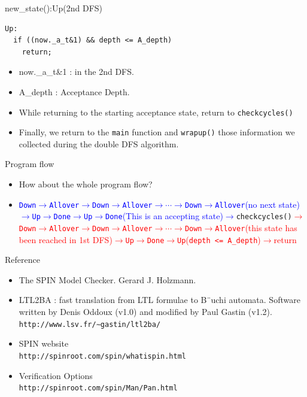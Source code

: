 \documentclass[12pt]{beamer}
\newcommand{\code}[1]{\texttt{#1}}
\begin{document}
\begin{frame}[fragile]{new\_state():Up(2nd DFS)}
\begin{lstlisting}[basicstyle=\footnotesize\ttfamily]
Up:
  if ((now._a_t&1) && depth <= A_depth)
    return;
\end{lstlisting}
\begin{itemize}
	\item now.\_a\_t\&1 : in the 2nd DFS.
	\item A\_depth : Acceptance Depth.
	\item While returning to the starting acceptance state, return to \code{checkcycles()}
	\item Finally, we return to the \code{main} function and \code{wrapup()} those information we collected during the double DFS algorithm.
\end{itemize}
\end{frame}

\begin{frame}[fragile]{Program flow}
\begin{itemize}
	\item How about the whole program flow?
	\item 
	\textcolor{blue}{\code{Down}$\rightarrow$\code{Allover}$\rightarrow$\code{Down}$\rightarrow$\code{Allover}$\rightarrow\cdots\rightarrow$\code{Down}$\rightarrow$\code{Allover}(no next state)$\rightarrow$\code{Up}$\rightarrow$\code{Done}$\rightarrow$\code{Up}$\rightarrow$\code{Done}(This is an accepting state)$\rightarrow$}\code{checkcycles()}\textcolor{red}{$\rightarrow$\code{Down}$\rightarrow$\code{Allover}$\rightarrow$\code{Down}$\rightarrow$\code{Allover}$\rightarrow\cdots\rightarrow$\code{Down}$\rightarrow$\code{Allover}(this state has been reached in 1st DFS)$\rightarrow$\code{Up}$\rightarrow$\code{Done}$\rightarrow$\code{Up}(\code{depth <= A\_depth})$\rightarrow$return}
\end{itemize}
\end{frame}


\begin{frame}{Reference}
\begin{itemize}
	\item The SPIN Model Checker. Gerard J. Holzmann.
	\item LTL2BA : fast translation from LTL formulae to B¨uchi automata. Software written by Denis
Oddoux (v1.0) and modified by Paul Gastin (v1.2).\\
		\code{http://www.lsv.fr/∼gastin/ltl2ba/}
	\item SPIN website\\
		\code{http://spinroot.com/spin/whatispin.html
}
	\item Verification Options\\
		\code{http://spinroot.com/spin/Man/Pan.html
}
\end{itemize}
\end{frame}
\end{document}
